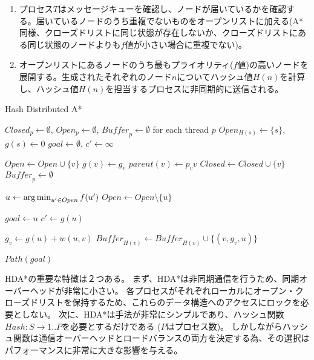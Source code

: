 \begin{enumerate}
	\item 
		プロセス$T$はメッセージキューを確認し、ノードが届いているかを確認する。届いているノードのうち重複でないものをオープンリストに加える(A*同様、クローズドリストに同じ状態が存在しないか、クローズドリストにある同じ状態のノードよりも$f$値が小さい場合に重複でない)。
	\item 
		オープンリストにあるノードのうち最もプライオリティ($f$値)の高いノードを展開する。生成されたそれぞれのノード$n$についてハッシュ値$H(n)$を計算し、ハッシュ値$H(n)$を担当するプロセスに非同期的に送信される。
\end{enumerate}


\begin{algorithm}
  \caption{Hash Distributed A*}
  $Closed_p \leftarrow \emptyset$, $Open_p \leftarrow \emptyset$, $\mathit{Buffer}_p \leftarrow \emptyset$ for each thread $p$\;
  $Open_{H(s)} \leftarrow \{s\}$, $g(s) \leftarrow 0$\;
  $goal \leftarrow \emptyset$, $c' \leftarrow \infty$\;

   {
   {
     {
       {
        $Open \leftarrow Open \cup \{v\}$\;
	$g(v) \leftarrow g_v$\;
        $parent(v) \leftarrow p_vv$\;
      }
       {
        $Closed \leftarrow Closed \cup \{v\}$\;
      }
    }
    $\mathit{Buffer}_p \leftarrow \emptyset$\;
     {
      $u \leftarrow \operatorname*{arg\,min}_{u' \in Open} f(u')$ \;
      $Open \leftarrow Open \setminus \{u\} $\;

       {
        $goal \leftarrow u$\;
        $c' \leftarrow g(u)$\;        
      }

       {
        $g_v \leftarrow g(u) + w(u, v)$\;
        $\mathit{Buffer}_{H(v)} \leftarrow \mathit{Buffer}_{H(v)} \cup \{(v, g_v, u)\}$\;
      }
    }
  }
  \Return $Path(goal)$\;
  }
  \label{alg:hdastar}
\end{algorithm}

HDA*の重要な特徴は２つある。
まず、HDA*は非同期通信を行うため、同期オーバーヘッドが非常に小さい。
各プロセスがそれぞれローカルにオープン・クローズドリストを保持するため、これらのデータ構造へのアクセスにロックを必要としない。
次に、HDA*は手法が非常にシンプルであり、ハッシュ関数$Hash: S \rightarrow {1..P}$を必要とするだけである ($P$はプロセス数)。
しかしながらハッシュ関数は通信オーバーヘッドとロードバランスの両方を決定する為、その選択はパフォーマンスに非常に大きな影響を与える。

